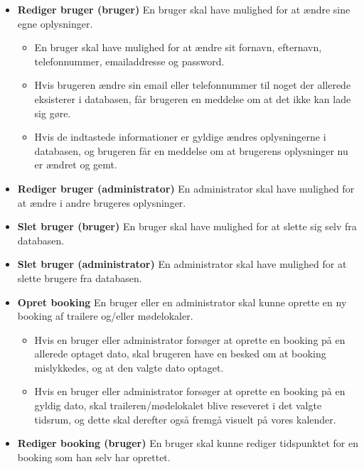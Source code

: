 \documentclass[12pt,a4paper]{report} %
\begin{document}
\begin{itemize}
        \item \textbf{Rediger bruger (bruger)\newline}
        En bruger skal have mulighed for at ændre sine egne oplysninger.
        \begin{itemize}
            \item En bruger skal have mulighed for at ændre sit fornavn, efternavn, telefonnummer, emailaddresse og password.
            \item Hvis brugeren ændre sin email eller telefonnummer til noget der allerede eksisterer i databasen, får brugeren en meddelse om at det ikke kan lade sig gøre. 
            \item Hvis de indtastede informationer er gyldige ændres oplysningerne i databasen, og brugeren får en meddelse om at brugerens oplysninger nu er ændret og gemt. 
        \end{itemize}
        \item \textbf{Rediger bruger (administrator)\newline}
        En administrator skal have mulighed for at ændre i andre brugeres oplysninger.
        \item \textbf{Slet bruger (bruger) \newline} 
        En bruger skal have mulighed for at slette sig selv fra databasen.
        \item \textbf{Slet bruger (administrator) \newline}
        En administrator skal have mulighed for at slette brugere fra databasen.
        \item \textbf{Opret booking\newline}
        En bruger eller en administrator skal kunne oprette en ny booking af trailere og/eller mødelokaler. 
        \begin{itemize}
            \item Hvis en bruger eller administrator forsøger at oprette en booking på en allerede optaget dato, skal brugeren have en besked om at booking mislykkedes, og at den valgte dato optaget.
            \item Hvis en bruger eller administrator forsøger at oprette en booking på en gyldig dato, skal traileren/mødelokalet blive reseveret i det valgte tidsrum, og dette skal derefter også fremgå visuelt på vores kalender. 
        \end{itemize}
        \item \textbf{Rediger booking (bruger)\newline}
        En bruger skal kunne rediger tidspunktet for en booking som han selv har oprettet.

\end{itemize}
\end{document}
